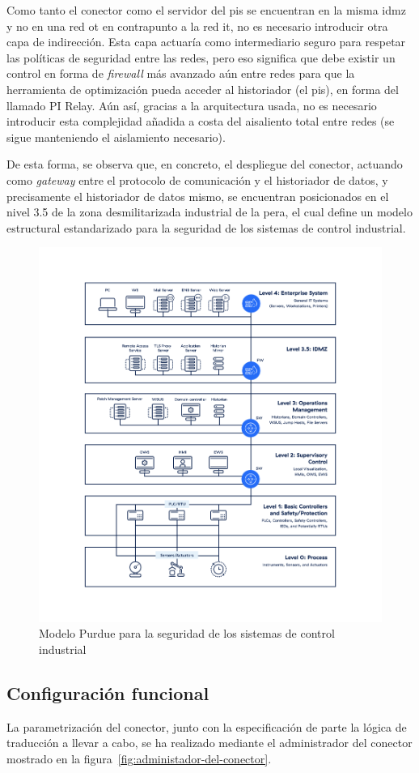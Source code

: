 Como tanto el conector como el servidor del \gls{pis} se encuentran en la misma \gls{idmz} y no en una red \gls{ot} en contrapunto a la red \gls{it}, no es necesario introducir otra capa de indirección. Esta capa actuaría como intermediario seguro para respetar las políticas de seguridad entre las redes, pero eso significa que debe existir un control en forma de \textit{firewall} más avanzado aún entre redes para que la herramienta de optimización pueda acceder al historiador (el \gls{pis}), en forma del llamado PI Relay. Aún así, gracias a la arquitectura usada, no es necesario introducir esta complejidad añadida a costa del aisaliento total entre redes (se sigue manteniendo el aislamiento necesario).

De esta forma, se observa que, en concreto, el despliegue del conector, actuando como \textit{gateway} entre el protocolo de comunicación y el historiador de datos, y precisamente el historiador de datos mismo, se encuentran posicionados en el nivel 3.5 de la zona desmilitarizada industrial de la \gls{pera}, el cual define un modelo estructural estandarizado para la seguridad de los sistemas de control industrial.

\begin{figure}
  \centering
  \includegraphics[width=0.5\linewidth]{figures/modelo-purdue.png}
  \caption{Modelo Purdue para la seguridad de los sistemas de control industrial~\cite{zscaler2025what}}
  \label{fig:modelo-purdue}
\end{figure}

\subsection{Configuración funcional}
\label{makereference3.4.3}

La parametrización del conector, junto con la especificación de parte la lógica de traducción a llevar a cabo, se ha realizado mediante el administrador del conector mostrado en la figura~\ref{fig:administador-del-conector}.

